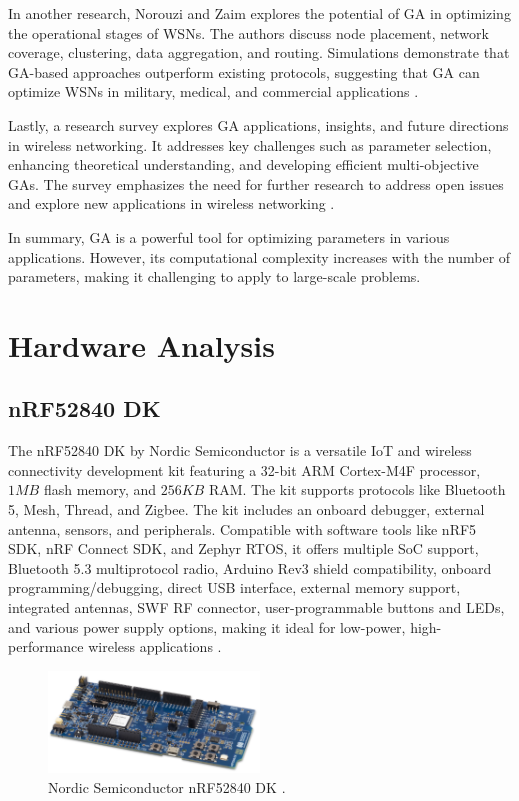 In another research, Norouzi and Zaim explores the potential of GA in optimizing the operational stages of WSNs. The authors discuss node placement, network coverage, clustering, data aggregation, and routing. Simulations demonstrate that GA-based approaches outperform existing protocols, suggesting that GA can optimize WSNs in military, medical, and commercial applications \cite{norouzi2014genetic}.

Lastly, a research survey explores GA applications, insights, and future directions in wireless networking. It addresses key challenges such as parameter selection, enhancing theoretical understanding, and developing efficient multi-objective GAs. The survey emphasizes the need for further research to address open issues and explore new applications in wireless networking \cite{mehboob2016genetic}.

In summary, GA is a powerful tool for optimizing parameters in various applications. However, its computational complexity increases with the number of parameters, making it challenging to apply to large-scale problems.


\section{Hardware Analysis}\label{sec:hardware_analysis}
\subsection{nRF52840 DK}
The nRF52840 DK by Nordic Semiconductor is a versatile IoT and wireless connectivity development kit featuring a 32-bit ARM Cortex-M4F processor, $1MB$ flash memory, and $256KB$ RAM. The kit supports protocols like Bluetooth 5, Mesh, Thread, and Zigbee. The kit includes an onboard debugger, external antenna, sensors, and peripherals. Compatible with software tools like nRF5 SDK, nRF Connect SDK, and Zephyr RTOS, it offers multiple SoC support, Bluetooth 5.3 multiprotocol radio, Arduino Rev3 shield compatibility, onboard programming/debugging, direct USB interface, external memory support, integrated antennas, SWF RF connector, user-programmable buttons and LEDs, and various power supply options, making it ideal for low-power, high-performance wireless applications \cite{Semiconductor_Nordic_Product_Brief_2018_2.0}.

\begin{figure}[!htb]
    \centering
    \includegraphics[width=0.5\textwidth]{images/situational_theoretical_analysis/nRF52840_DK.png}
    \caption{Nordic Semiconductor nRF52840 DK \cite{Semiconductor_Nordic_Product_Brief_2018_2.0}.}
    \label{fig:nRF52840_DK}
\end{figure}

